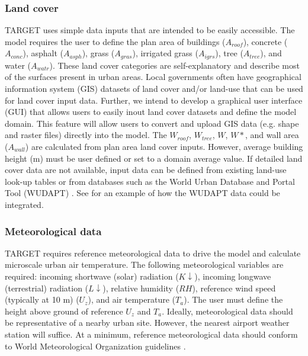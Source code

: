 \documentclass[journal abbreviation, manuscript]{copernicus}
\begin{document}
\subsubsection{Land cover}\label{sec:landcover}

TARGET uses simple data inputs that are intended to be easily accessible.  The model requires the user to define the plan area of buildings (\ensuremath{A_{roof}}), concrete (\ensuremath{A_{conc}}), asphalt (\ensuremath{A_{asph}}), grass (\ensuremath{A_{gras}}), irrigated grass (\ensuremath{A_{igrs}}), tree (\ensuremath{A_{tree}}), and water (\ensuremath{A_{watr}}). These land cover categories are self-explanatory and describe most of the surfaces present in urban areas. Local governments often have geographical information system (GIS) datasets of land cover and/or land-use that can be used for land cover input data. Further, we intend to develop a graphical user interface (GUI) that allows users to easily inout land cover datasets and define the model domain. This  feature will allow users to convert and upload GIS data (e.g. shape and raster files) directly into the model. The $W_{roof}$, $W_{tree}$, $W$, $W*$, and wall area (\ensuremath{A_{wall}}) are calculated from plan area land cover inputs. However, average building height (m) must be user defined or set to a domain average value. If detailed land cover data are not available, input data can be defined from existing land-use look-up tables or from databases such as the World Urban Database and Portal Tool (WUDAPT) \citep{mills2015,Ching2018}. See \cite{wouters2016efficient} for an example of how the WUDAPT data could be integrated. 


\subsubsection{Meteorological data}\label{sec:metdata}

TARGET requires reference meteorological data to drive the model and calculate microscale urban air temperature. The following meteorological variables are required: incoming shortwave (solar) radiation (\ensuremath{K\downarrow}), incoming longwave (terrestrial) radiation (\ensuremath{L\downarrow}), relative humidity (\ensuremath{RH}), reference wind speed (typically at 10 m) (\ensuremath{U_{z}}), and air temperature (\ensuremath{T_{a}}). The user must define the height above ground of reference \ensuremath{U_{z}} and \ensuremath{T_{a}}. Ideally, meteorological data should be representative of a nearby urban site. However, the nearest airport weather station will suffice. %
At a minimum, reference meteorological data should conform to World Meteorological Organization guidelines \citep{oke2007siting}.
\end{document}

